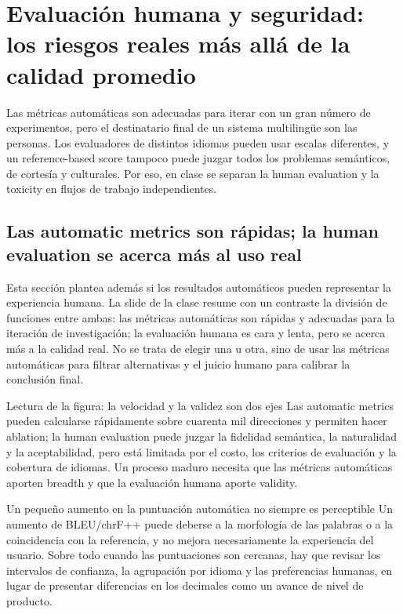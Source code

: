 \section{Evaluación humana y seguridad: los riesgos reales más allá de la calidad promedio}

Las métricas automáticas son adecuadas para iterar con un gran número de experimentos, pero el destinatario final de un sistema multilingüe son las personas. Los evaluadores de distintos idiomas pueden usar escalas diferentes, y un reference-based score tampoco puede juzgar todos los problemas semánticos, de cortesía y culturales. Por eso, en clase se separan la human evaluation y la toxicity en flujos de trabajo independientes.

\subsection{Las automatic metrics son rápidas; la human evaluation se acerca más al uso real}

Esta sección plantea además si los resultados automáticos pueden representar la experiencia humana. La slide de la clase resume con un contraste la división de funciones entre ambas: las métricas automáticas son rápidas y adecuadas para la iteración de investigación; la evaluación humana es cara y lenta, pero se acerca más a la calidad real. No se trata de elegir una u otra, sino de usar las métricas automáticas para filtrar alternativas y el juicio humano para calibrar la conclusión final.


\begin{knowledgebox}{Lectura de la figura: la velocidad y la validez son dos ejes}
Las automatic metrics pueden calcularse rápidamente sobre cuarenta mil direcciones y permiten hacer ablation; la human evaluation puede juzgar la fidelidad semántica, la naturalidad y la aceptabilidad, pero está limitada por el costo, los criterios de evaluación y la cobertura de idiomas. Un proceso maduro necesita que las métricas automáticas aporten breadth y que la evaluación humana aporte validity.
\end{knowledgebox}

\begin{warningbox}{Un pequeño aumento en la puntuación automática no siempre es perceptible}
Un aumento de BLEU/chrF++ puede deberse a la morfología de las palabras o a la coincidencia con la referencia, y no mejora necesariamente la experiencia del usuario. Sobre todo cuando las puntuaciones son cercanas, hay que revisar los intervalos de confianza, la agrupación por idioma y las preferencias humanas, en lugar de presentar diferencias en los decimales como un avance de nivel de producto.
\end{warningbox}

